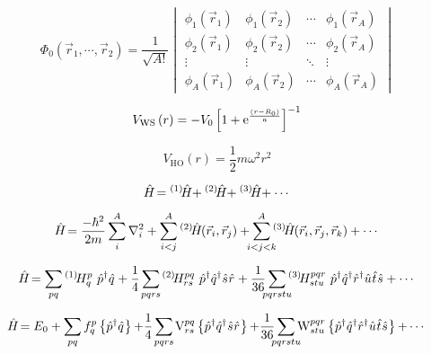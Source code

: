 \documentclass[thesis.tex]{subfiles}
\begin{document}
\begin{equation}
  \Phi_{0}\left(\vec{r}_{1},\cdots,\vec{r}_{2}\right) =
  \frac{1}{\sqrt{A!}}\begin{vmatrix}
    \phi_{1}\left(\vec{r}_{1}\right) & \phi_{1}\left(\vec{r}_{2}\right) & \cdots & \phi_{1}\left(\vec{r}_{A}\right) \\
    \phi_{2}\left(\vec{r}_{1}\right) & \phi_{2}\left(\vec{r}_{2}\right) & \cdots & \phi_{2}\left(\vec{r}_{A}\right) \\
    \vdots & \vdots & \ddots & \vdots \\
    \phi_{A}\left(\vec{r}_{1}\right) & \phi_{A}\left(\vec{r}_{2}\right) & \cdots & \phi_{A}\left(\vec{r}_{A}\right)
  \end{vmatrix}
\end{equation}

\begin{equation}
  V_{\text{WS}}\left( r \right) = -V_{0} \left[ 1 + \operatorname{e}^{\frac{\left( r-R_{0} \right)}{a}} \right]^{-1}
\end{equation}

\begin{equation}
  V_{\text{HO}}\left( r \right) = \frac{1}{2}m\omega^{2}r^{2}
\end{equation}

\begin{equation}
  \hat{H}\hspace{-1.5pt} = {}^{\left(1\right)}\hspace{-2pt}\hat{H}\hspace{-2.5pt} + {}^{\left(2\right)}\hspace{-2pt}\hat{H}\hspace{-2.5pt} + {}^{\left(3\right)}\hspace{-2pt}\hat{H}\hspace{-2.5pt} + \cdots
\end{equation}

\begin{equation}
  \Ham = \frac{-\hbar^{2}}{2m}\sum^{A}_{\mathclap{i}}\nabla^{2}_{i} + \sum^{A}_{\mathclap{i<j}}\HamB{2}\left(\vec{r}_{i},\vec{r}_{j}\right) + \sum^{A}_{\mathclap{i<j<k}}\HamB{3}\left(\vec{r}_{i},\vec{r}_{j},\vec{r}_{k}\right) + \cdots
\end{equation}

\begin{equation}
  \Ham = \sum_{\mathclap{pq}}\Hint{1}{p}{q}\ \co{p}\ao{q} + \frac{1}{4}\sum_{\mathclap{pqrs}}\Hint{2}{pq}{rs}\ \co{p}\co{q}\ao{s}\ao{r} + \frac{1}{36}\sum_{\mathclap{pqrstu}}\Hint{3}{pqr}{stu}\ \co{p}\co{q}\co{r}\ao{u}\ao{t}\ao{s} + \cdots
\end{equation}

\begin{equation}
  \Ham = E_{0} + \sum_{\mathclap{pq}}\fint{p}{q}\normord{\co{p}\ao{q}} + \frac{1}{4}\sum_{\mathclap{pqrs}}\vint{pq}{rs}\normord{\co{p}\co{q}\ao{s}\ao{r}} + \frac{1}{36}\sum_{\mathclap{pqrstu}}\wint{pqr}{stu}\normord{\co{p}\co{q}\co{r}\ao{u}\ao{t}\ao{s}} + \cdots
\end{equation}
\end{document}
